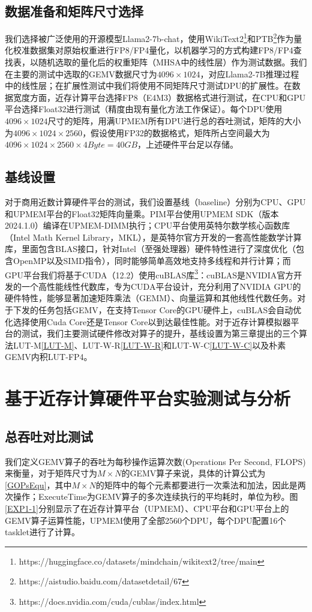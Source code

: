 \subsection{数据准备和矩阵尺寸选择}
我们选择被广泛使用的开源模型Llama2-7b-chat，使用WikiText2\footnote{https://huggingface.co/datasets/mindchain/wikitext2/tree/main}和PTB\footnote{https://aistudio.baidu.com/datasetdetail/67}作为量化校准数据集对原始权重进行FP8/FP4量化，以机器学习的方式构建FP8/FP4查找表，以随机选取的量化后的权重矩阵（MHSA中的线性层）作为测试数据。我们在主要的测试中选取的GEMV数据尺寸为$4096\times 1024$，对应Llama2-7B推理过程中的线性层；在扩展性测试中我们将使用不同矩阵尺寸测试DPU的扩展性。在数据宽度方面，近存计算平台选择FP8（E4M3）数据格式进行测试，在CPU和GPU平台选择Float32进行测试（精度由现有量化方法工作保证）。每个DPU使用$4096\times 1024$尺寸的矩阵，用满UPMEM所有DPU进行总的吞吐测试，矩阵的大小为$4096\times 1024\times 2560$，假设使用FP32的数据格式，矩阵所占空间最大为$4096\times 1024\times 2560\times 4Byte=40GB$，上述硬件平台足以存储。

\subsection{基线设置}
对于商用近数计算硬件平台的测试，我们设置基线（baseline）分别为CPU、GPU和UPMEM平台的Float32矩阵向量乘。PIM平台使用UPMEM SDK（版本 2024.1.0）编译在UPMEM-DIMM执行；CPU平台使用英特尔数学核心函数库（Intel Math Kernel Library，MKL）\cite{IntelMKL}，是英特尔官方开发的一套高性能数学计算库，里面包含BLAS接口，针对Intel（至强处理器）硬件特性进行了深度优化（包含OpenMP以及SIMD指令），同时能够简单高效地支持多线程和并行计算；而GPU平台我们将基于CUDA（12.2）使用cuBLAS库\footnote{https://docs.nvidia.com/cuda/cublas/index.html}：cuBLAS是NVIDIA官方开发的一个高性能线性代数库，专为CUDA平台设计，充分利用了NVIDIA GPU的硬件特性，能够显著加速矩阵乘法（GEMM）、向量运算和其他线性代数任务。对于下发的任务包括GEMV，在支持Tensor Core的GPU硬件上，cuBLAS会自动优化选择使用Cuda Core还是Tensor Core以到达最佳性能。对于近存计算模拟器平台的测试，我们主要测试硬件修改对算子的提升，基线设置为第三章提出的三个算法LUT-M\ref{LUT-M}、LUT-W-R\ref{LUT-W-R}和LUT-W-C\ref{LUT-W-C}以及朴素GEMV内积LUT-FP4。

\section{基于近存计算硬件平台实验测试与分析}

\subsection{总吞吐对比测试}
我们定义GEMV算子的吞吐为每秒操作运算次数(Operations Per Second, FLOPS)来衡量，对于矩阵尺寸为$M\times N$的GEMV算子来说，具体的计算公式为\ref{GOPsEqu}，其中$M\times N$的矩阵中的每个元素都要进行一次乘法和加法，因此是两次操作；ExecuteTime为GEMV算子的多次连续执行的平均耗时，单位为秒。图\ref{EXP1-1}分别显示了在近存计算平台（UPMEM）、CPU平台和GPU平台上的GEMV算子运算性能，UPMEM使用了全部2560个DPU，每个DPU配置16个tasklet进行了计算。

